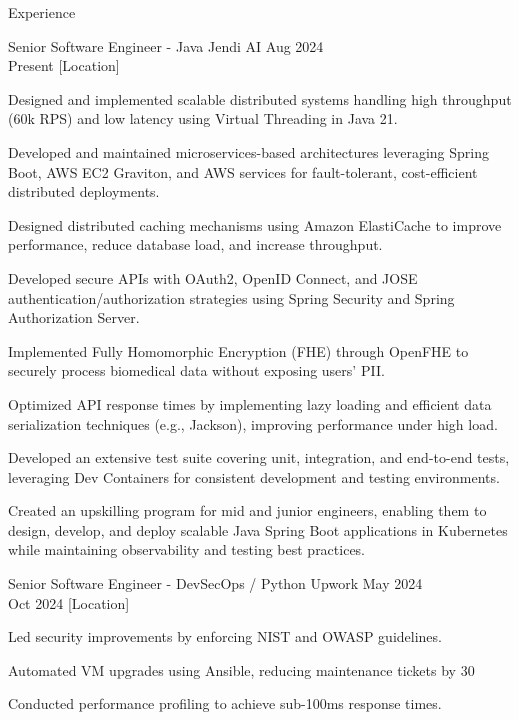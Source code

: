 \documentclass{resume} %
\begin{document}
\begin{rSection}{Experience}
    \begin{rSubsection}
        {Senior Software Engineer - Java}
        {Jendi AI}
        {Aug 2024 \\ Present}
        [Location]
        \begin{rItemize}
            \item Designed and implemented scalable distributed systems handling high throughput (60k RPS) and low latency using Virtual Threading in Java 21.
            \item Developed and maintained microservices-based architectures leveraging Spring Boot, AWS EC2 Graviton, and AWS services for fault-tolerant, cost-efficient distributed deployments.
            \item Designed distributed caching mechanisms using Amazon ElastiCache to improve performance, reduce database load, and increase throughput.
            \item Developed secure APIs with OAuth2, OpenID Connect, and JOSE authentication/authorization strategies using Spring Security and Spring Authorization Server.
            \item Implemented Fully Homomorphic Encryption (FHE) through OpenFHE to securely process biomedical data without exposing users' PII.
            \item Optimized API response times by implementing lazy loading and efficient data serialization techniques (e.g., Jackson), improving performance under high load.
            \item Developed an extensive test suite covering unit, integration, and end-to-end tests, leveraging Dev Containers for consistent development and testing environments.
            \item Created an upskilling program for mid and junior engineers, enabling them to design, develop, and deploy scalable Java Spring Boot applications in Kubernetes while maintaining observability and testing best practices.
        \end{rItemize}
    \end{rSubsection}

    \begin{rSubsection}
        {Senior Software Engineer - DevSecOps / Python}
        {Upwork}
        {May 2024 \\ Oct 2024}
        [Location]
        \begin{rItemize}
            \item Led security improvements by enforcing NIST and OWASP guidelines.
            \item Automated VM upgrades using Ansible, reducing maintenance tickets by 30%
            \item Conducted performance profiling to achieve sub-100ms response times.
        \end{rItemize}
    \end{rSubsection}


\end{rSection}
\end{document}
